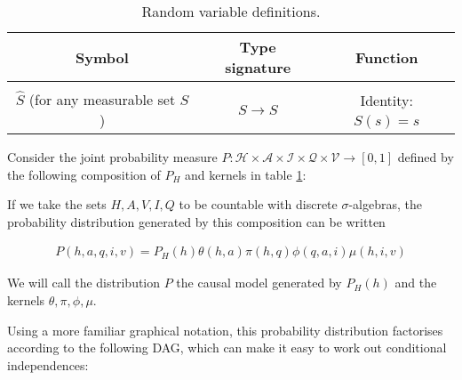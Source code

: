 \begin{table}[h]
    \centering
    \begin{tabular}{c|c|c}
        Symbol & Type signature & Function  \\
        \hline
        & & \\
        $\hat{S}$ (for any measurable set $S$) & $S\to S$ & Identity: $\hat{S}(s)=s$ \\
    \end{tabular}
    \caption{Random variable definitions.}
    \label{tab:kernels}
\end{table}

Consider the joint probability measure $P:\mathcal{H}\times \mathcal{A}\times \mathcal{I}\times \mathcal{Q}\times \mathcal{V}\to [0,1]$ defined by the following composition of $P_H$ and kernels in table \ref{tab:kernels}:

\begin{center}
\end{center}

If we take the sets $H,A,V,I,Q$ to be countable with discrete $\sigma$-algebras, the probability distribution generated by this composition can be written

\begin{align}
    P(h,a,q,i,v) = P_H(h)\theta(h,a)\pi(h,q)\phi(q,a,i)\mu(h,i,v)
\end{align}

We will call the distribution $P$ the causal model generated by $P_H(h)$ and the kernels $\theta,\pi,\phi,\mu$.

Using a more familiar graphical notation, this probability distribution factorises according to the following DAG, which can make it easy to work out conditional independences:


